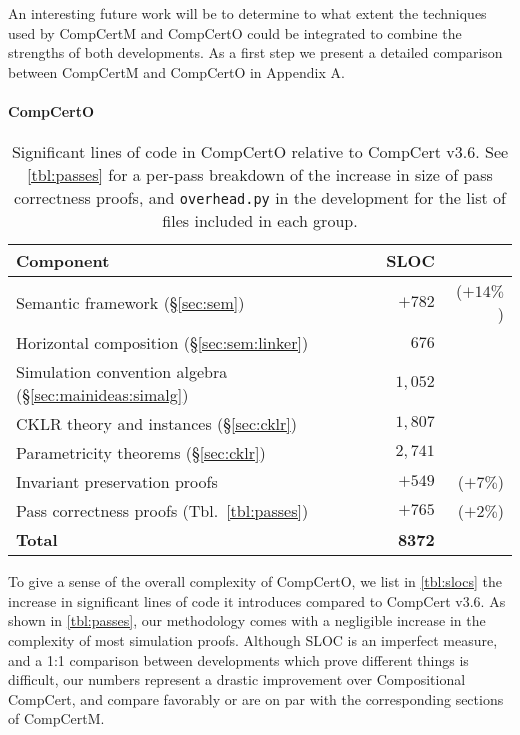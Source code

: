 \documentclass[sigplan,10pt,review]{acmart}
\newcommand{\figsize}{\small}
\begin{document}
An interesting future work will be to determine
to what extent the techniques used by CompCertM and CompCertO could be
integrated to combine the strengths of both developments.  As a first
step we present a detailed comparison between CompCertM and CompCertO
in Appendix A.


\paragraph{CompCertO}

\begin{table} %
  \caption{Significant lines of code in CompCertO
    relative to CompCert v$3.6$.
    See \autoref{tbl:passes}
    for a per-pass breakdown of the increase in size
    of pass correctness proofs,
    and \texttt{overhead.py} in the development
    for the list of files included in each group.}
  \label{tbl:slocs}
  \figsize
  \begin{tabular}{lrr}
    \hline
    Component & SLOC & \\ %
    \hline
    Semantic framework (\S\ref{sec:sem}) & $+782$ & ($+14\%$) \\
    Horizontal composition (\S\ref{sec:sem:linker}) & $676$ & \\
    Simulation convention algebra (\S\ref{sec:mainideas:simalg}) & $1{,}052$ & \\
    CKLR theory and instances (\S\ref{sec:cklr}) & $1{,}807$ & \\
    Parametricity theorems (\S\ref{sec:cklr}) & $2{,}741$ & \\
    Invariant preservation proofs & $+549$ & ($+7\%$) \\
    Pass correctness proofs (Tbl.~\ref{tbl:passes}) & $+765$ & ($+2\%$) \\
    \textbf{Total} & \textbf{8372} & \\
    \hline
  \end{tabular}
\end{table}

To give a sense of the overall complexity of CompCertO,
we list in \autoref{tbl:slocs}
the increase in significant lines of code it introduces
compared to CompCert v$3.6$.
As shown in \autoref{tbl:passes},
our methodology comes with a negligible increase
in the complexity of most simulation proofs.
Although SLOC is an imperfect measure,
and a 1:1 comparison between developments which
prove different things is difficult,
our numbers represent
a drastic improvement over Compositional CompCert,
and compare favorably
or are on par with
the corresponding sections of CompCertM.
\end{document}
